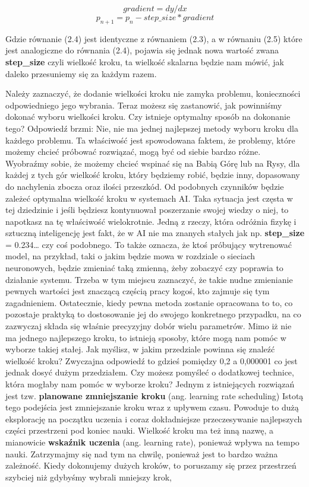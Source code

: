 \begin{equation}
gradient = dy / dx
\end{equation}
\begin{equation}
p_{n+1} = p_n - step\_size * gradient
\end{equation}

\noindent Gdzie równanie (2.4) jest identyczne z równaniem (2.3), a w równaniu (2.5) które jest analogiczne do równania (2.4), pojawia się jednak nowa wartość zwana \textbf{step\_size} czyli wielkość kroku, ta wielkość skalarna będzie nam mówić, jak daleko przesuniemy się za każdym razem.\newline

Należy zaznaczyć, że dodanie wielkości kroku nie zamyka problemu, konieczności odpowiedniego jego wybrania. Teraz możesz się zastanowić, jak powinniśmy dokonać wyboru wielkości kroku. Czy istnieje optymalny sposób na dokonanie tego? Odpowiedź brzmi: Nie, nie ma jednej najlepszej metody wyboru kroku dla każdego problemu. Ta właściwość jest spowodowana faktem, że problemy, które możemy chcieć próbować rozwiązać, mogą być od siebie bardzo różne. Wyobraźmy sobie, że możemy chcieć wspinać się na Babią Górę lub na Rysy, dla każdej z tych gór wielkość kroku, który będziemy robić, będzie inny, dopasowany do nachylenia zbocza oraz ilości przeszkód. Od podobnych czynników będzie zależeć optymalna wielkość kroku w systemach AI. Taka sytuacja jest częsta w tej dziedzinie i jeśli będziesz kontynuował poszerzanie swojej wiedzy o niej, to napotkasz na tę właściwość wielokrotnie. Jedną z rzeczy, która odróżnia fizykę i sztuczną inteligencję jest fakt, że w AI nie ma znanych stałych jak np. \textbf{step\_size} = 0.234… czy coś podobnego. To także oznacza, że ktoś próbujący wytrenować model, na przykład, taki o jakim będzie mowa w rozdziale o sieciach neuronowych, będzie zmieniać taką zmienną, żeby zobaczyć czy poprawia to działanie systemu. Trzeba w tym miejscu zaznaczyć, że takie nudne zmienianie pewnych wartości jest znaczącą częścią pracy kogoś, kto zajmuje się tym zagadnieniem. Ostatecznie, kiedy pewna metoda zostanie opracowana to to, co pozostaje praktyką to dostosowanie jej do swojego konkretnego przypadku, na co zazwyczaj składa się właśnie precyzyjny dobór wielu parametrów. Mimo iż nie ma jednego najlepszego kroku, to istnieją sposoby, które mogą nam pomóc w wyborze takiej stałej. Jak myślisz, w jakim przedziale powinna się znaleźć wielkość kroku? Zwyczajna odpowiedź to gdzieś pomiędzy 0,2 a 0,000001 co jest jednak dosyć dużym przedziałem. Czy możesz pomyśleć o dodatkowej technice, która mogłaby nam pomóc w wyborze kroku? Jednym z istniejących rozwiązań jest tzw. \textbf{planowane zmniejszanie kroku} (ang. learning rate scheduling) Istotą tego podejścia jest zmniejszanie kroku wraz z upływem czasu. Powoduje to dużą eksplorację na początku uczenia i coraz dokładniejsze przeczesywanie najlepszych części przestrzeni pod koniec nauki. Wielkość kroku ma też inną nazwę, a mianowicie \textbf{wskaźnik uczenia} (ang. learning rate), ponieważ wpływa na tempo nauki. Zatrzymajmy się nad tym na chwilę, ponieważ jest to bardzo ważna zależność. Kiedy dokonujemy dużych kroków, to poruszamy się przez przestrzeń szybciej niż gdybyśmy wybrali mniejszy krok, 
